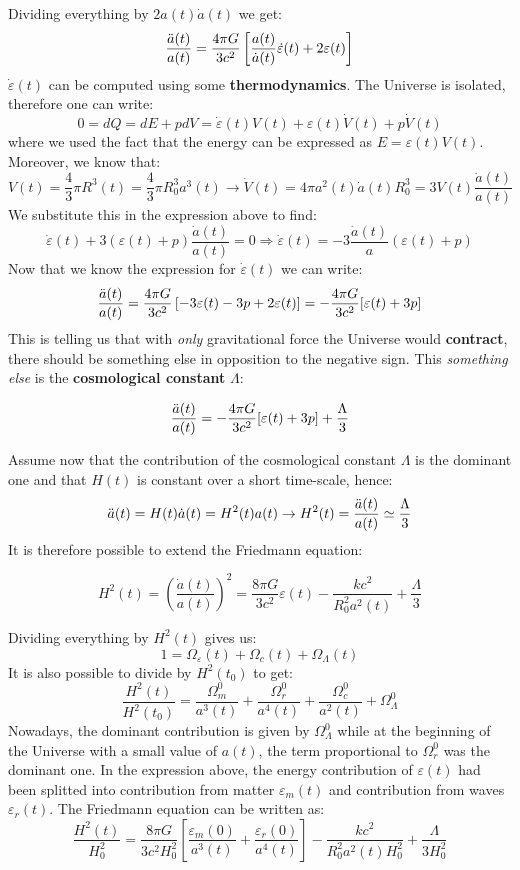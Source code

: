 \documentclass[10.75pt,a4paper,openright,bottom=2cm]{article}
\newcommand{\beginbox}[1]{\begin{tcolorbox}[width=\textwidth,colback={black!40},title={#1},colbacktitle={purple!55},coltitle=black]}
\renewcommand{\endbox}{\end{tcolorbox}\noindent}
\begin{document}
Dividing everything by $2a(t)\Dot{a}(t)$ we get:
\[
\frac{\Ddot{a}(t)}{a(t)}=\frac{4\pi G}{3c^2}\left[\frac{a(t)}{\Dot{a}(t)}\Dot{\varepsilon}(t)+2\varepsilon(t)\right]
\]
$\Dot{\varepsilon}(t)$ can be computed using some \textbf{thermodynamics}. The Universe is isolated, therefore one can write:
\[
0=dQ=dE+pdV=\Dot{\varepsilon}(t)V(t)+\varepsilon(t)\Dot{V}(t)+p\Dot{V}(t)
\]
where we used the fact that the energy can be expressed as $E=\varepsilon(t)V(t)$. Moreover, we know that:
\[
V(t)=\frac{4}{3}\pi R^3(t)=\frac{4}{3}\pi R_0^3a^3(t)\to\Dot{V}(t)=4\pi a^2(t)\Dot{a}(t)R_0^3=3V(t)\frac{\Dot{a}(t)}{a(t)}
\]
We substitute this in the expression above to find:
\[
\Dot{\varepsilon}(t)+3(\varepsilon(t)+p)\frac{\Dot{a}(t)}{a(t)}=0\Rightarrow\Dot{\varepsilon}(t)=-3\frac{\Dot{a}(t)}{a}(\varepsilon(t)+p)
\]
Now that we know the expression for $\Dot{\varepsilon}(t)$ we can write:
\[
\frac{\Ddot{a}(t)}{a(t)}=\frac{4\pi G}{3c^2}\left[-3\varepsilon(t)-3p+2\varepsilon(t)\right]=-\frac{4\pi G}{3c^2}[\varepsilon(t)+3p]
\]
This is telling us that with \textit{only} gravitational force the Universe would \textbf{contract}, there should be something else in opposition to the negative sign. This \textit{something else} is the \textbf{cosmological constant} $\Lambda$:
\beginbox{Cosmological Constant} 
\[
\frac{\Ddot{a}(t)}{a(t)}=-\frac{4\pi G}{3c^2}[\varepsilon(t)+3p]+\frac{\Lambda}{3}
\]
\endbox
Assume now that the contribution of the cosmological constant $\Lambda$ is the dominant one and that $H(t)$ is constant over a short time-scale, hence:
\[
\Ddot{a}(t)=H(t)\Dot{a}(t)=H^2(t)a(t)\to H^2(t)=\frac{\Ddot{a}(t)}{a(t)}\simeq\frac{\Lambda}{3}
\]
It is therefore possible to extend the Friedmann equation:
\beginbox{Full Metal Friedmann Equation}
\[
H^2(t)=\left(\frac{\Dot{a}(t)}{a(t)}\right)^2=\frac{8\pi G}{3c^2}\varepsilon(t)-\frac{kc^2}{R_0^2a^2(t)}+\frac{\Lambda}{3}
\]
\endbox
Dividing everything by $H^2(t)$ gives us:
\[
1=\Omega_\varepsilon(t)+\Omega_c(t)+\Omega_\Lambda(t)
\]
It is also possible to divide by $H^2(t_0)$ to get:
\[
\frac{H^2(t)}{H^2(t_0)}=\frac{\Omega_m^0}{a^3(t)}+\frac{\Omega_r^0}{a^4(t)}+\frac{\Omega_c^0}{a^2(t)}+\Omega_\Lambda^0
\]
Nowadays, the dominant contribution is given by $\Omega_\Lambda^0$ while at the beginning of the Universe with a small value of $a(t)$, the term proportional to $\Omega_r^0$ was the dominant one. In the expression above, the energy contribution of $\varepsilon(t)$ had been splitted into contribution from matter $\varepsilon_m(t)$ and contribution from waves $\varepsilon_r(t)$. The Friedmann equation can be written as:
\[
\frac{H^2(t)}{H_0^2}=\frac{8\pi G}{3c^2H_0^2}\left[\frac{\varepsilon_m(0)}{a^3(t)}+\frac{\varepsilon_r(0)}{a^4(t)}\right]-\frac{kc^2}{R_0^2a^2(t)H_0^2}+\frac{\Lambda}{3H_0^2}
\]
\end{document}

